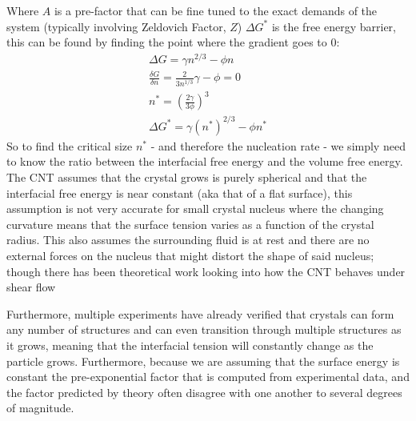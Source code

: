 Where $A$ is a pre-factor that can be fine tuned to the exact demands of the system (typically involving Zeldovich Factor, $Z$) $\Delta G^*$ is the free energy barrier, this can be found by finding the point where the gradient goes to 0:
\begin{align}
	\Delta G = \gamma n^{2/3}-\phi n \\
	\frac{\delta G}{\delta n} = \frac{2}{3n^{1/3}}\gamma - \phi  = 0 \\
	n^* = \left( \frac{2\gamma}{3\phi} \right)^3 \\
	\Delta G^* = \gamma (n^*)^{2/3} - \phi n^*
\end{align}
So to find the critical size $n^*$  - and therefore the nucleation rate - we simply need to know the ratio between the interfacial free energy and the volume free energy. The CNT assumes that the crystal grows is purely spherical and that the interfacial free energy is near constant (aka that of a flat surface), this assumption is not very accurate for small crystal nucleus where the changing curvature means that the surface tension varies as a function of the crystal radius. This also assumes the surrounding fluid is at rest and there are no external forces on the nucleus that might distort the shape of said nucleus; though there has been theoretical work looking into how the CNT behaves under shear flow \cite{Debuysschere2023, Mura2016, Richard2015}

Furthermore, multiple experiments have already verified that crystals can form any number of structures and can even transition through multiple structures as it grows, meaning that the interfacial tension will constantly change as the particle grows. Furthermore, because we are assuming that the surface energy is constant the pre-exponential factor that is computed from experimental data, and the factor predicted by theory often disagree with one another to several degrees of magnitude. 

